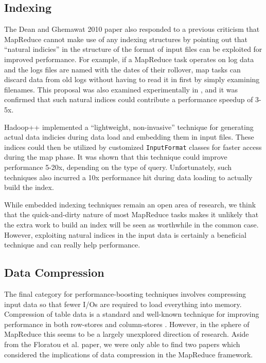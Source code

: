 \documentclass[twocolumn]{article}
\begin{document}
\subsection{Indexing}

The Dean and Ghemawat 2010 paper also responded
to a previous criticism that MapReduce cannot make use of any indexing structures
by pointing out that ``natural indicies'' in the structure of the format of input
files can be exploited for improved performance.  For example, if a MapReduce
task operates on log data and the logs files are named with the dates of their
rollover, map tasks can discard data from old logs without having to read it 
in first by simply examining filenames.  This proposal was also examined
experimentally in \cite{ref:perf-study}, and it was confirmed that such
natural indices could contribute a performance speedup of 3-5x.

Hadoop++ \cite{ref:hadoop++} implemented a ``lightweight, non-invasive''
technique for generating actual data indicies during data load and embedding
them in input files.  These indices could then be utilized by customized
\verb+InputFormat+ classes for faster access during the map phase.  It was
shown that this technique could improve performance 5-20x, depending on
the type of query.  Unfortunately, such techniques also incurred a 10x
performance hit during data loading to actually build the index.

While embedded indexing techniques remain an open area of research, we think
that the quick-and-dirty nature of most MapReduce tasks makes it
unlikely that the extra work to build an index will be seen as worthwhile
in the common case.  However, exploiting natural indices in the input
data is certainly a beneficial technique and can really help performance.

\subsection{Data Compression}

The final category for performance-boosting techniques involves compressing
input data so that fewer I/Os are required to load everything into memory.
Compression of table data is a standard and well-known technique for
improving performance in both row-stores and column-stores \cite{ref:colstore-comp}.
However, in the sphere of MapReduce this seems to be a largely unexplored
direction of research.  Aside from the Floratou et al. paper, we were
only able to find two papers which considered the implications of data
compression in the MapReduce framework.
\end{document}
